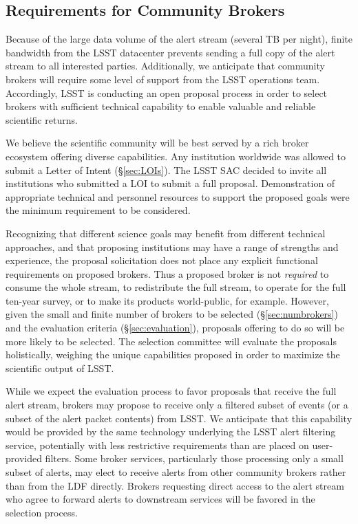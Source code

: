 \subsection{Requirements for Community Brokers}

Because of the large data volume of the alert stream (several TB per night), finite bandwidth from the LSST datacenter prevents sending a full copy of the alert stream to all interested parties.
Additionally, we anticipate that community brokers will require some level of support from the LSST operations team.
Accordingly, LSST is conducting an open proposal process in order to select brokers with sufficient technical capability to enable valuable and reliable scientific returns.

We believe the scientific community will be best served by a rich broker ecosystem offering diverse capabilities.
Any institution worldwide was allowed to submit a Letter of Intent (\S \ref{sec:LOIs}). 
The LSST SAC decided to invite all institutions who submitted a LOI to submit a full proposal.
Demonstration of appropriate technical and personnel resources to support the proposed goals were the minimum requirement to be considered.

Recognizing that different science goals may benefit from different technical approaches, and that proposing institutions may have a range of strengths and experience, the proposal solicitation does not place any explicit functional requirements on proposed brokers.
Thus a proposed broker is not \textit{required} to consume the whole stream, to redistribute the full stream, to operate for the full ten-year survey, or to make its products world-public, for example.
However, given the small and finite number of brokers to be selected (\S \ref{sec:numbrokers}) and the evaluation criteria (\S \ref{sec:evaluation}), proposals offering to do so will be more likely to be selected.
The selection committee will evaluate the proposals holistically, weighing the unique capabilities proposed in order to maximize the scientific output of LSST.

While we expect the evaluation process to favor proposals that receive the full alert stream, brokers may propose to receive only a filtered subset of events (or a subset of the alert packet contents) from LSST.
We anticipate that this capability would be provided by the same technology underlying the LSST alert filtering service, potentially with less restrictive requirements than are placed on user-provided filters.
Some broker services, particularly those processing only a small subset of alerts, may elect to receive alerts from other community brokers rather than from the LDF directly.
Brokers requesting direct access to the alert stream who agree to forward alerts to downstream services will be favored in the selection process.

